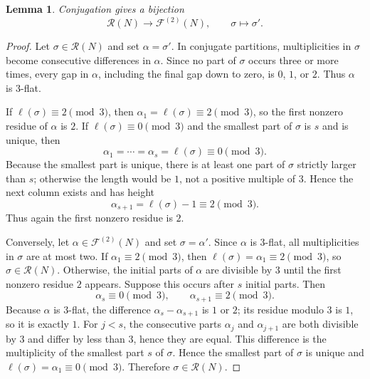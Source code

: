 \documentclass[11pt]{amsart}
\newtheorem{lemma}[theorem]{Lemma}
\theoremstyle{definition}
\theoremstyle{remark}
\newcommand{\R}{\mathcal R}
\newcommand{\F}{\mathcal F}
\begin{document}
\begin{lemma}\label{lem:conj}
Conjugation gives a bijection
\[
        \R(N)\longrightarrow\F^{(2)}(N),
        \qquad \sigma\longmapsto\sigma'.
\]
\end{lemma}

\begin{proof}
Let $\sigma\in\R(N)$ and set $\alpha=\sigma'$.  In conjugate partitions, multiplicities in $\sigma$ become consecutive differences in $\alpha$.  Since no part of $\sigma$ occurs three or more times, every gap in $\alpha$, including the final gap down to zero, is $0$, $1$, or $2$.  Thus $\alpha$ is $3$-flat.

If $\ell(\sigma)\equiv2\pmod3$, then $\alpha_1=\ell(\sigma)\equiv2\pmod3$, so the first nonzero residue of $\alpha$ is $2$.  If $\ell(\sigma)\equiv0\pmod3$ and the smallest part of $\sigma$ is $s$ and is unique, then
\[
        \alpha_1=\cdots=\alpha_s=\ell(\sigma)\equiv0\pmod3.
\]
Because the smallest part is unique, there is at least one part of $\sigma$ strictly larger than $s$; otherwise the length would be $1$, not a positive multiple of $3$.  Hence the next column exists and has height
\[
        \alpha_{s+1}=\ell(\sigma)-1\equiv2\pmod3.
\]
Thus again the first nonzero residue is $2$.

Conversely, let $\alpha\in\F^{(2)}(N)$ and set $\sigma=\alpha'$.  Since $\alpha$ is $3$-flat, all multiplicities in $\sigma$ are at most two.  If $\alpha_1\equiv2\pmod3$, then $\ell(\sigma)=\alpha_1\equiv2\pmod3$, so $\sigma\in\R(N)$.  Otherwise, the initial parts of $\alpha$ are divisible by $3$ until the first nonzero residue $2$ appears.  Suppose this occurs after $s$ initial parts.  Then
\[
        \alpha_s\equiv0\pmod3,
        \qquad
        \alpha_{s+1}\equiv2\pmod3.
\]
Because $\alpha$ is $3$-flat, the difference $\alpha_s-\alpha_{s+1}$ is $1$ or $2$; its residue modulo $3$ is $1$, so it is exactly $1$. 
For \(j<s\), the consecutive parts \(\alpha_j\) and \(\alpha_{j+1}\) are both
divisible by \(3\) and differ by less than \(3\), hence they are equal.
 This difference is the multiplicity of the smallest part $s$ of $\sigma$.  Hence the smallest part of $\sigma$ is unique and $\ell(\sigma)=\alpha_1\equiv0\pmod3$.  Therefore $\sigma\in\R(N)$.
\end{proof}
\end{document}

